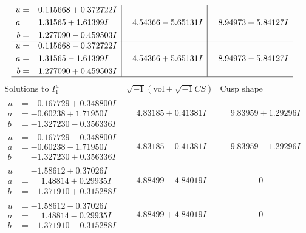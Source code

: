 \documentclass[1p]{elsarticle_modified}
\theoremstyle{definition}
\newcommand{\I}{\sqrt{-1}}
\begin{document}
$$\begin{array}{c|c|c}
\begin{aligned}
u &= \phantom{-}0.115668 + 0.372722 I \\
a &= \phantom{-}1.31565 + 1.61399 I \\
b &= \phantom{-}1.277090 - 0.459503 I\end{aligned}
 & \phantom{-}4.54366 - 5.65131 I & \phantom{-}8.94973 + 5.84127 I \\ \hline\begin{aligned}
u &= \phantom{-}0.115668 - 0.372722 I \\
a &= \phantom{-}1.31565 - 1.61399 I \\
b &= \phantom{-}1.277090 + 0.459503 I\end{aligned}
 & \phantom{-}4.54366 + 5.65131 I & \phantom{-}8.94973 - 5.84127 I\\
 \hline 
 \end{array}$$\newpage$$\begin{array}{c|c|c}  
\text{Solutions to }I^u_{1}& \I (\text{vol} + \sqrt{-1}CS) & \text{Cusp shape}\\
 \hline 
\begin{aligned}
u &= -0.167729 + 0.348800 I \\
a &= -0.60238 + 1.71950 I \\
b &= -1.327230 - 0.356336 I\end{aligned}
 & \phantom{-}4.83185 + 0.41381 I & \phantom{-}9.83959 + 1.29296 I \\ \hline\begin{aligned}
u &= -0.167729 - 0.348800 I \\
a &= -0.60238 - 1.71950 I \\
b &= -1.327230 + 0.356336 I\end{aligned}
 & \phantom{-}4.83185 - 0.41381 I & \phantom{-}9.83959 - 1.29296 I \\ \hline\begin{aligned}
u &= -1.58612 + 0.37026 I \\
a &= \phantom{-}1.48814 + 0.29935 I \\
b &= -1.371910 + 0.315288 I\end{aligned}
 & \phantom{-}4.88499 - 4.84019 I & \phantom{-0.000000 } 0 \\ \hline\begin{aligned}
u &= -1.58612 - 0.37026 I \\
a &= \phantom{-}1.48814 - 0.29935 I \\
b &= -1.371910 - 0.315288 I\end{aligned}
 & \phantom{-}4.88499 + 4.84019 I & \phantom{-0.000000 } 0 \\ \hline\begin{aligned}

\end{aligned}
\end{array}$$
\end{document}

